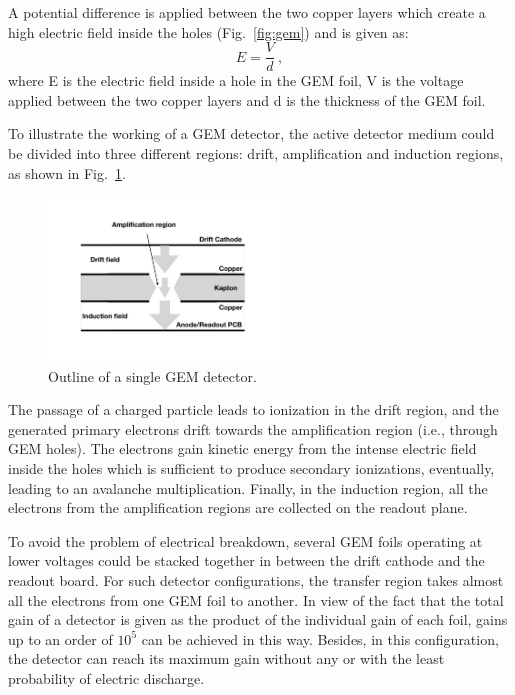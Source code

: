 A potential difference is applied between the two copper layers which create a high electric field inside the holes (Fig.~\ref{fig:gem}) and is given as:
\begin{equation}
    E = \frac{V}{d}~,
\end{equation}
where E is the electric field inside a hole in the GEM foil, V is the voltage applied between the two copper layers and d is the thickness of the GEM foil.

To illustrate the working of a GEM detector, the active detector medium could be divided into three different regions: drift, amplification and induction regions, as shown in Fig.~\ref{fig:gemOutline}.
\begin{figure}[htbp]
    \centering
    \includegraphics[width=0.55\textwidth]{figures/GEM/SingleGEM_Detector.pdf}
    \caption{Outline of a single GEM detector.}
    \label{fig:gemOutline}
\end{figure}
The passage of a charged particle leads to ionization in the drift region, and the generated primary electrons drift towards the amplification region (i.e., through GEM holes). 
The electrons gain kinetic energy from the intense electric field inside the holes which is sufficient to produce secondary ionizations, eventually, leading to an avalanche multiplication.
Finally, in the induction region, all the electrons from the amplification regions are collected on the readout plane. 

To avoid the problem of electrical breakdown, several GEM foils operating at lower voltages could be stacked together in between the drift cathode and the readout board.
For such detector configurations, the transfer region takes almost all the electrons from one GEM foil to another.
In view of the fact that the total gain of a detector is given as the product of the individual gain of each foil, gains up to an order of $10^5$ can be achieved in this way.
Besides, in this configuration, the detector can reach its maximum gain without any or with the least probability of electric discharge.

